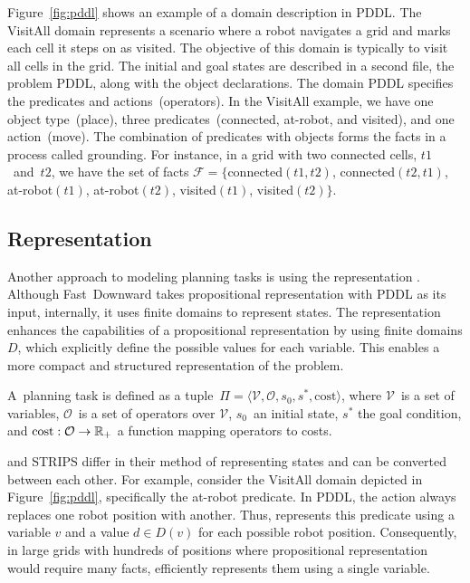 Figure~\ref{fig:pddl} shows an example of a domain description in PDDL. The VisitAll domain represents a scenario where a robot navigates a grid and marks each cell it steps on as visited. The objective of this domain is typically to visit all cells in the grid. The initial and goal states are described in a second file, the problem PDDL, along with the object declarations. The domain PDDL specifies the predicates and actions~(operators). In the VisitAll example, we have one object type~(place), three predicates~(connected, at-robot, and visited), and one action~(move). The combination of predicates with objects forms the facts in a process called grounding. For instance, in a grid with two connected cells, $t1$~and~$t2$, we have the set of facts $\mathcal{F}=\{$connected$(t1,t2)$, \mbox{connected$(t2,t1)$}, \mbox{at-robot$(t1)$}, \mbox{at-robot$(t2)$}, \mbox{visited$(t1)$}, visited$(t2)\}$.

\subsection{\sas Representation}
\label{sec:background_sas}

Another approach to modeling planning tasks is using the \sas representation \cite{Backstrom.Nebel/1995}. Although Fast~Downward takes propositional representation with PDDL as its input, internally, it uses finite domains to represent states. The \sas representation enhances the capabilities of a propositional representation by using finite domains $D$, which explicitly define the possible values for each variable. This enables a more compact and structured representation of the problem.

\begin{definition}\label{def:sasplanningtask}
    A~\sas planning task is defined as a tuple~$\Pi=\langle\mathcal{V},\mathcal{O},s_0,s^*, \text{cost}\rangle$, where $\mathcal{V}$~is a set of variables, $\mathcal{O}$~is a set of operators over $\mathcal{V}$, $s_0$~an initial state, $s^*$ the goal condition, and $\text{cost}:\mathcal{O}\rightarrow\mathbb{R}_{+}$ a function mapping operators to costs.
\end{definition}

\sas and STRIPS differ in their method of representing states and can be converted between each other. For example, consider the VisitAll domain depicted in Figure~\ref{fig:pddl}, specifically the at-robot predicate. In PDDL, the action always replaces one robot position with another. Thus, \sas represents this predicate using a variable $v$ and a value $d \in D(v)$ for each possible robot position. Consequently, in large grids with hundreds of positions where propositional representation would require many facts, \sas efficiently represents them using a single variable.

